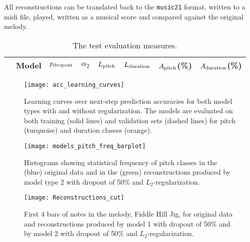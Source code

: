 All reconstructions can be translated back to the \texttt{music21} format, written to a midi file, played, written as a musical score and compared against the original melody.

\begin{table*}
    \centering
    \caption{
        The test evaluation measures.
    }
    \label{tab:test_eval}
    \begin{tabular}{
            l@{}
            S[table-format = 1.0]
            S[table-format = 0.2]
            S[table-format = 1.0]
            S[table-format = 1.3]
            S[table-format = 1.3]
            S[table-format = 2.2]
            S[table-format = 2.2]
        }
        \toprule
        & {Model} 
        & {$p_{\text{dropout}}$}
        & {$\alpha_2$}
        & {$L_{\text{pitch}}$}
        & {$L_{\text{duration}}$}
        & {$A_{\text{pitch}}$(\%)}
        & {$A_{\text{duration}}$(\%)} \\
        \midrule
        
        \bottomrule
    \end{tabular}
\end{table*}

\begin{figure*}
    \centering
    \texttt{[image: acc\_learning\_curves]}
    \caption{Learning curves over next-step prediction accuracies for both model types with and without regularization. The models are evaluated on both training (solid lines) and validation sets (dashed lines) for pitch (turquoise) and duration classes (orange).}
    \label{fig:learning_curves}
\end{figure*}

\begin{figure*}
    \centering
    \texttt{[image: models\_pitch\_freq\_barplot]}
    \caption{Histograms showing statistical frequency of pitch classes in the (blue) original data and in the (green) reconstructions produced by model type 2 with dropout of 50\% and $L_2$-regularization.}
    \label{fig:histogram}
\end{figure*}

\begin{figure*}
    \centering
    \texttt{[image: Reconstructions\_cut]}
    \caption{First 4 bars of notes in the melody, Fiddle Hill Jig, for original data and reconstructions produced by model 1 with dropout of 50\% and by model 2 with dropout of 50\% and $L_2$-regularization.}
    \label{fig:reconstructions}
\end{figure*}
